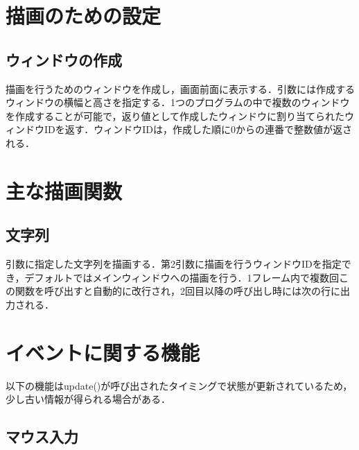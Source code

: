 \documentclass[a4paper, 11pt, oneside, onecolumn, openany]{jsarticle}
\begin{document}
\section{描画のための設定}
\subsection{ウィンドウの作成}
描画を行うためのウィンドウを作成し，画面前面に表示する．引数には作成するウィンドウの横幅と高さを指定する．1つのプログラムの中で複数のウィンドウを作成することが可能で，返り値として作成したウィンドウに割り当てられたウィンドウIDを返す．ウィンドウIDは，作成した順に0からの連番で整数値が返される．


\section{主な描画関数}

\subsection{文字列}
引数に指定した文字列を描画する．第2引数に描画を行うウィンドウIDを指定でき，デフォルトではメインウィンドウへの描画を行う．1フレーム内で複数回この関数を呼び出すと自動的に改行され，2回目以降の呼び出し時には次の行に出力される．


\section{イベントに関する機能}
以下の機能はupdate()が呼び出されたタイミングで状態が更新されているため，少し古い情報が得られる場合がある．
\subsection{マウス入力}
\end{document}
